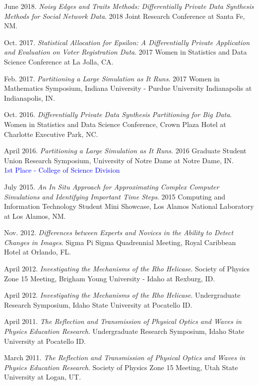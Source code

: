 \documentclass[11pt, letterpaper, roman]{moderncv} %
\begin{document}
\begin{etaremune}[topsep=0pt, itemsep=4pt, partopsep=0pt, parsep=0pt]
    \item June 2018. \textit{Noisy Edges and Traits Methods: Differentially Private Data Synthesis Methods for Social Network Data}. 2018 Joint Research Conference at Santa Fe, NM.
    
    \item Oct. 2017. \textit{Statistical Allocation for Epsilon: A Differentially Private Application and Evaluation on Voter Registration Data}. 2017 Women in Statistics and Data Science Conference at La Jolla, CA.
    
    \item Feb. 2017. \textit{Partitioning a Large Simulation as It Runs}. 2017 Women in Mathematics Symposium, Indiana University - Purdue University Indianapolis at Indianapolis, IN.
    
    \item Oct. 2016. \textit{Differentially Private Data Synthesis Partitioning for Big Data}. Women in Statistics and Data Science Conference, Crown Plaza Hotel at Charlotte Executive Park, NC. 
    
    \item April 2016. \textit{Partitioning a Large Simulation as It Runs}. 2016 Graduate Student Union Research Symposium, University of Notre Dame at Notre Dame, IN.\\
    \textcolor{blue}{1st Place - College of Science Division}
    
    \item July 2015. \textit{An In Situ Approach for Approximating Complex Computer Simulations and Identifying Important Time Steps}. 2015 Computing and Information Technology Student Mini Showcase, Los Alamos National Laboratory at Los Alamos, NM.
    
    \item Nov. 2012. \textit{Differences between Experts and Novices in the Ability to Detect Changes in Images}. Sigma Pi Sigma Quadrennial Meeting, Royal Caribbean Hotel at Orlando, FL.
    
    \item April 2012. \textit{Investigating the Mechanisms of the Rho Helicase}. Society of Physics Zone 15 Meeting, Brigham Young University - Idaho at Rexburg, ID.
    
    \item April 2012. \textit{Investigating the Mechanisms of the Rho Helicase}. Undergraduate Research Symposium, Idaho State University at Pocatello ID.
    
    \item April 2011. \textit{The Reflection and Transmission of Physical Optics and Waves in Physics Education Research}. Undergraduate Research Symposium, Idaho State University at Pocatello ID.
    
    \item March 2011. \textit{The Reflection and Transmission of Physical Optics and Waves in Physics Education Research}. Society of Physics Zone 15 Meeting, Utah State University at Logan, UT.
\end{etaremune}
\end{document}
